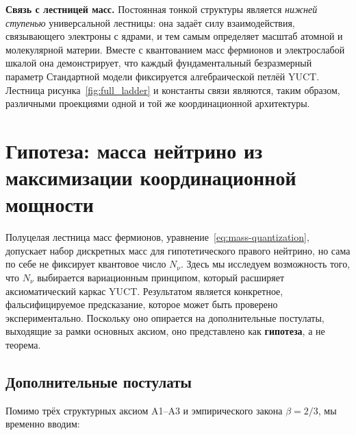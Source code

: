 \documentclass[11pt,a4paper]{article}
\begin{document}
	\textbf{Связь с лестницей масс.}  Постоянная тонкой структуры является
	\emph{нижней ступенью} универсальной лестницы: она задаёт силу
	взаимодействия, связывающего электроны с ядрами, и тем самым определяет масштаб атомной
	и молекулярной материи.  Вместе с квантованием масс фермионов и
	электрослабой шкалой она демонстрирует, что каждый фундаментальный безразмерный параметр
	Стандартной модели фиксируется алгебраической петлёй YUCT.  Лестница
	рисунка~\ref{fig:full_ladder} и константы связи являются, таким образом, различными
	проекциями одной и той же координационной архитектуры.
	
	\section{Гипотеза: масса нейтрино из максимизации координационной мощности}
	\label{sec:neutrino-hypothesis}
	
	Полуцелая лестница масс фермионов, уравнение~\eqref{eq:mass-quantization}, допускает набор дискретных масс для гипотетического правого нейтрино, но сама по себе не фиксирует квантовое число \(N_{\nu}\).  Здесь мы исследуем возможность того, что \(N_{\nu}\) выбирается вариационным принципом, который расширяет аксиоматический каркас YUCT.  Результатом является конкретное, фальсифицируемое предсказание, которое может быть проверено экспериментально.  Поскольку оно опирается на дополнительные постулаты, выходящие за рамки основных аксиом, оно представлено как \textbf{гипотеза}, а не теорема.
	
	\subsection{Дополнительные постулаты}
	
	Помимо трёх структурных аксиом A1--A3 и эмпирического закона \(\beta=2/3\), мы временно вводим:
	
\end{document}
